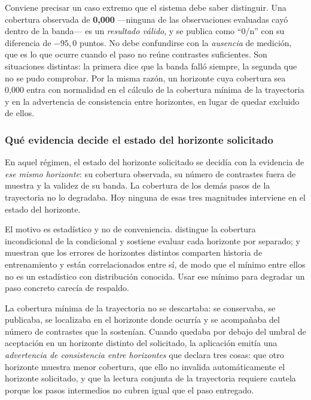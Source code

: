 \documentclass[12pt,letterpaper]{article}
\providecommand{\textcite}{\citet}
\begin{document}
Conviene precisar un caso extremo que el sistema debe saber distinguir. Una cobertura observada de \textbf{0,000} ---ninguna de las observaciones evaluadas cayó dentro de la banda--- es un \emph{resultado válido}, y se publica como ``0/n'' con su diferencia de \(-95{,}0\) puntos. No debe confundirse con la \emph{ausencia} de medición, que es lo que ocurre cuando el paso no reúne contrastes suficientes. Son situaciones distintas: la primera dice que la banda falló siempre, la segunda que no se pudo comprobar. Por la misma razón, un horizonte cuya cobertura sea 0,000 entra con normalidad en el cálculo de la cobertura mínima de la trayectoria y en la advertencia de consistencia entre horizontes, en lugar de quedar excluido de ellos.

\subsubsection*{Qué evidencia decide el estado del horizonte solicitado}

En aquel régimen, el estado del horizonte solicitado se decidía con la evidencia de \emph{ese mismo horizonte}: su cobertura observada, su número de contrastes fuera de muestra y la validez de su banda. La cobertura de los demás pasos de la trayectoria no lo degradaba. Hoy ninguna de esas tres magnitudes interviene en el estado del horizonte.

El motivo es estadístico y no de conveniencia. \textcite{christoffersen1998} distingue la cobertura incondicional de la condicional y sostiene evaluar cada horizonte por separado; \textcite{diebold1995} y \textcite{clark2013} muestran que los errores de horizontes distintos comparten historia de entrenamiento y están correlacionados entre sí, de modo que el mínimo entre ellos no es un estadístico con distribución conocida. Usar ese mínimo para degradar un paso concreto carecía de respaldo.

La cobertura mínima de la trayectoria no se descartaba: se conservaba, se publicaba, se localizaba en el horizonte donde ocurría y se acompañaba del número de contrastes que la sostenían. Cuando quedaba por debajo del umbral de aceptación en un horizonte distinto del solicitado, la aplicación emitía una \emph{advertencia de consistencia entre horizontes} que declara tres cosas: que otro horizonte muestra menor cobertura, que ello no invalida automáticamente el horizonte solicitado, y que la lectura conjunta de la trayectoria requiere cautela porque los pasos intermedios no cubren igual que el paso entregado.
\end{document}
